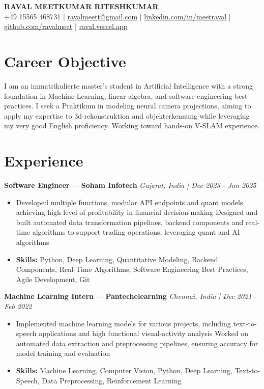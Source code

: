 \documentclass[a4paper,10pt]{article}
\begin{document}
\begin{center}
  {\Large\bfseries RAVAL MEETKUMAR RITESHKUMAR}\\[2pt]
  {\small +49 15565 468731 \;|\; \href{mailto:ravalmeett@gmail.com}{ravalmeett@gmail.com} \;|\; \href{https://www.linkedin.com/in/meetraval/}{linkedin.com/in/meetraval} \;|\; \href{https://github.com/ravalmeet}{github.com/ravalmeet} \;|\; \href{https://raval.vercel.app/}{raval.vercel.app}}
\end{center}
\vspace{-3pt}

\section*{Career Objective}
I am an immatrikulierte master's student in Artificial Intelligence with a strong foundation in Machine Learning, linear algebra, and software engineering best practices. I seek a Praktikum in modeling neural camera projections, aiming to apply my expertise to 3d-rekonstruktion and objekterkennung while leveraging my very good English proficiency. Working toward hands-on V-SLAM experience.\par

\section*{Experience}
\textbf{Software Engineer} — \textbf{Soham Infotech} \hfill \textit{Gujarat, India \;|\; Dec 2023 - Jan 2025}\par
\vspace{1pt}
\begin{itemize}
  \item Developed multiple functions, modular API endpoints and quant models achieving high level of profitability in financial decision-making Designed and built automated data transformation pipelines, backend components and real-time algorithms to support trading operations, leveraging quant and AI algorithms
  \item \textbf{Skills:} Python, Deep Learning, Quantitative Modeling, Backend Components, Real-Time Algorithms, Software Engineering Best Practices, Agile Development, Git
\end{itemize}
\vspace{3pt}
\textbf{Machine Learning Intern} — \textbf{Pantechelearning} \hfill \textit{Chennai, India \;|\; Dec 2021 - Feb 2022}\par
\vspace{1pt}
\begin{itemize}
  \item Implemented machine learning models for various projects, including text-to-speech applications and high functional visual-activity analysis Worked on automated data extraction and preprocessing pipelines, ensuring accuracy for model training and evaluation
  \item \textbf{Skills:} Machine Learning, Computer Vision, Python, Deep Learning, Text-to-Speech, Data Preprocessing, Reinforcement Learning
\end{itemize}
\end{document}
